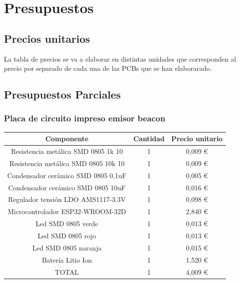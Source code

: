 \documentclass[a4paper ,12pt, onecolumn]{article}
\begin{document}
\section{Presupuestos}
    \subsection{Precios unitarios}
        La tabla de precios se va a elaborar en distintas unidades que corresponden al precio por separado de cada
        una de las PCBs que se han elaborarado.
    \subsection{Presupuestos Parciales}
            \subsubsection{Placa de circuito impreso emisor beacon}
                \begin{center}
                    \begin{tabular}{||c | c |c ||} 
                    \hline
                    Componente & Cantidad & Precio unitario  \\ [0.5ex] 
                    \hline
                    Resistencia metálica SMD 0805 1k 10  	&1&	 0,009 € \\ 
                    Resistencia metálica SMD 0805 10k 10 	&1&	 0,009 € \\ 
                    Condensador cerámico SMD 0805 0,1uF  	&1&	 0,005 € \\ 
                    Condensador cerámico SMD 0805 10uF   	&1&	 0,016 € \\ 
                    Regulador tensión LDO AMS1117-3.3V   	&1&	 0,098 € \\ 
                    Microcontrolador ESP32-WROOM-32D     	&1&	 2,840 € \\ 
                    Led SMD 0805 verde                   	&1&	 0,013 € \\ 
                    Led SMD 0805 rojo                    	&1&	 0,013 € \\ 
                    Led SMD 0805 naranja                 	&1&	 0,015 € \\ 
                    Batería Litio Ion                    	&1&	 1,520 € \\ 
                    \hline
                    TOTAL                    	            &1&	 4,009 € \\ 

                \hline
                    \end{tabular}
                \end{center}
\end{document}

